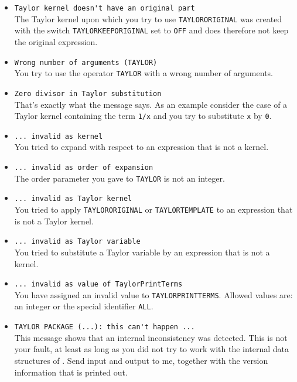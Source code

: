 \begin{itemize}
\item \verb|Taylor kernel doesn't have an original part|\\
 
    The Taylor kernel upon which you try to use \verb|TAYLORORIGINAL|
    was created with the switch \verb|TAYLORKEEPORIGINAL|
    set to \verb|OFF|
    and does therefore not keep the original expression.

\item \verb|Wrong number of arguments (TAYLOR)|\\
    You try to use the operator \verb|TAYLOR| with a wrong number of
    arguments.

\item \verb|Zero divisor in Taylor substitution|\\
    That's exactly what the message says.  As an example consider the
    case of a Taylor kernel containing the term \verb|1/x| and you try
    to substitute \verb|x| by \verb|0|.

\item \verb|... invalid as kernel|\\
    You tried to expand with respect to an expression that is not a
    kernel.

\item \verb|... invalid as order of expansion|\\
    The order parameter you gave to \verb|TAYLOR| is not an integer.

\item \verb|... invalid as Taylor kernel|\\
 
    You tried to apply \verb|TAYLORORIGINAL| or \verb|TAYLORTEMPLATE|
    to an expression that is not a Taylor kernel.

\item \verb|... invalid as Taylor variable|\\
    You tried to substitute a Taylor variable by an expression that is
    not a kernel.

\item \verb|... invalid as value of TaylorPrintTerms|\\
    You have assigned an invalid value to \verb|TAYLORPRINTTERMS|.
    Allowed values are: an integer or the special identifier
    \verb|ALL|.

\item \verb|TAYLOR PACKAGE (...): this can't happen ...|\\
    This message shows that an internal inconsistency was detected.
    This is not your fault, at least as long as you did not try to
    work with the internal data structures of \REDUCE. Send input
    and output to me, together with the version information that is
    printed out.

\end{itemize}


